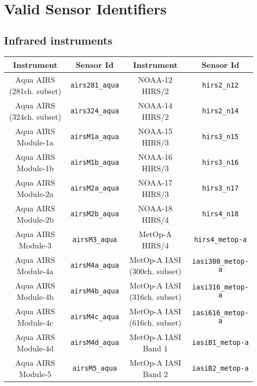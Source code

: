\chapter{Valid Sensor Identifiers}

\section{Infrared instruments}

\begin{table}[htp]
  \centering
  \begin{tabular}{|c|c||c|c|}
    \hline
    \sffamily\textbf{Instrument} & \sffamily\textbf{Sensor Id} & \sffamily\textbf{Instrument} & \sffamily\textbf{Sensor Id} \\
    \hline\hline
Aqua AIRS (281ch. subset) & \texttt{airs281\_aqua} & NOAA-12 HIRS/2 & \texttt{hirs2\_n12}                      \\
Aqua AIRS (324ch. subset) & \texttt{airs324\_aqua} & NOAA-14 HIRS/2 & \texttt{hirs2\_n14}                      \\
Aqua AIRS Module-1a & \texttt{airsM1a\_aqua}       & NOAA-15 HIRS/3 & \texttt{hirs3\_n15}                      \\
Aqua AIRS Module-1b & \texttt{airsM1b\_aqua}       & NOAA-16 HIRS/3 & \texttt{hirs3\_n16}                      \\
Aqua AIRS Module-2a & \texttt{airsM2a\_aqua}       & NOAA-17 HIRS/3 & \texttt{hirs3\_n17}                      \\
Aqua AIRS Module-2b & \texttt{airsM2b\_aqua}       & NOAA-18 HIRS/4 & \texttt{hirs4\_n18}                      \\
Aqua AIRS Module-3  & \texttt{airsM3\_aqua}        & MetOp-A HIRS/4 & \texttt{hirs4\_metop-a}                  \\
Aqua AIRS Module-4a & \texttt{airsM4a\_aqua}       & MetOp-A IASI (300ch. subset) & \texttt{iasi300\_metop-a}  \\
Aqua AIRS Module-4b & \texttt{airsM4b\_aqua}       & MetOp-A IASI (316ch. subset)  & \texttt{iasi316\_metop-a} \\
Aqua AIRS Module-4c & \texttt{airsM4c\_aqua}       & MetOp-A IASI (616ch. subset)  & \texttt{iasi616\_metop-a} \\
Aqua AIRS Module-4d & \texttt{airsM4d\_aqua}       & MetOp-A IASI Band 1 & \texttt{iasiB1\_metop-a}            \\
Aqua AIRS Module-5  & \texttt{airsM5\_aqua}        & MetOp-A IASI Band 2 & \texttt{iasiB2\_metop-a}            \\

\end{tabular}
\end{table}
